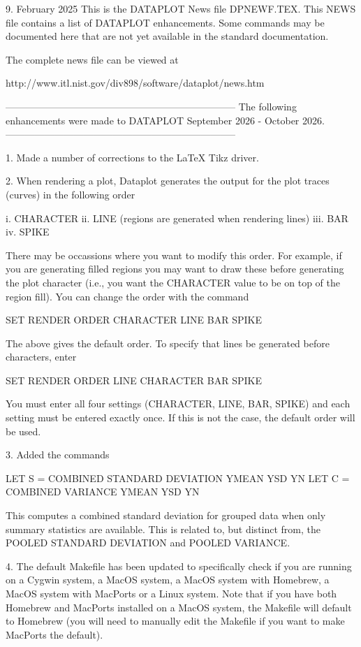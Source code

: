 9.
                                                     February 2025
This is the DATAPLOT News file DPNEWF.TEX.  This NEWS file contains a
list of DATAPLOT enhancements.  Some commands may be documented here
that are not yet available in the standard documentation.

The complete news file can be viewed at

    http://www.itl.nist.gov/div898/software/dataplot/news.htm

-----------------------------------------------------------------------
The following enhancements were made to DATAPLOT
September 2026 - October 2026.
-----------------------------------------------------------------------

 1. Made a number of corrections to the LaTeX Tikz driver.

 2. When rendering a plot, Dataplot generates the output for the plot
    traces (curves) in the following order

       i. CHARACTER
      ii. LINE (regions are generated when rendering lines)
     iii. BAR
      iv. SPIKE

    There may be occassions where you want to modify this order.  For
    example, if you are generating filled regions you may want to
    draw these before generating the plot character (i.e., you want
    the CHARACTER value to be on top of the region fill).  You can
    change the order with the command

         SET RENDER ORDER CHARACTER LINE BAR SPIKE

    The above gives the default order.  To specify that lines be
    generated before characters, enter

         SET RENDER ORDER LINE CHARACTER BAR SPIKE

    You must enter all four settings (CHARACTER, LINE, BAR, SPIKE) and
    each setting must be entered exactly once.  If this is not the case,
    the default order will be used.

 3. Added the commands

       LET S = COMBINED STANDARD DEVIATION YMEAN YSD YN
       LET C = COMBINED VARIANCE           YMEAN YSD YN

    This computes a combined standard deviation for grouped data when only
    summary statistics are available.  This is related to, but distinct from,
    the POOLED STANDARD DEVIATION and POOLED VARIANCE.

 4. The default Makefile has been updated to specifically check if you
    are running on a Cygwin system, a MacOS system, a MacOS system with
    Homebrew, a MacOS system with MacPorts or a Linux system.  Note that
    if you have both Homebrew and MacPorts installed on a MacOS system,
    the Makefile will default to Homebrew (you will need to manually edit
    the Makefile if you want to make MacPorts the default).

